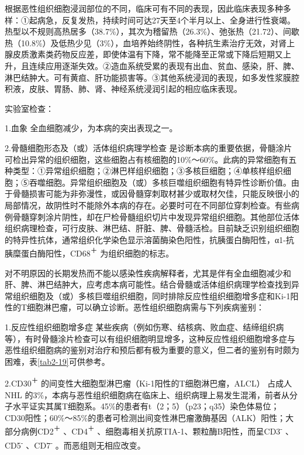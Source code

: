 根据恶性组织细胞浸润部位的不同，临床可有不同的表现，因此临床表现多种多样：①起病急，反复发热，持续时间可达27天至4个半月以上、全身进行性衰竭。热型以不规则高热居多（38.7\%），其次为稽留热（26.3\%）、弛张热（21.72）、间歇热（10.8\%）及低热少见（3\%），血培养始终阴性，各种抗生素治疗无效，对肾上腺皮质激素类药物反应差，即使体温有下降，常不能降至正常或下降后短期又上升，且连续应用逐渐失效。②造血系统受累的表现有出血、贫血、感染，肝、脾、淋巴结肿大。可有黄疸、肝功能损害等。③其他系统浸润的表现，如多发性浆膜腔积液，皮肤、胃肠、肺、肾、神经系统浸润引起的相应临床表现。

实验室检查：

1.血象 全血细胞减少，为本病的突出表现之一。

2.骨髓细胞形态及（或）活体组织病理学检查
是诊断本病的重要依据，骨髓涂片可检出异常的组织细胞，这些细胞占有核细胞的10\%～60\%。此病的异常细胞有五种类型：①异常组织细胞；②淋巴样组织细胞；③多核巨细胞；④单核样组织细胞；⑤吞噬细胞。异常组织细胞及（或）多核巨噬组织细胞有特异性诊断价值。由于骨髓损害可能为非弥漫性，或因骨髓穿刺取材甚少或取材欠佳，只能反映很小的局部情况，故阴性时不能除外本病的存在。必要时可在不同部位穿刺检查。有些病例骨髓穿刺涂片阴性，却在尸检骨髓组织切片中发现异常组织细胞。其他部位活体组织病理检查，可行皮肤、淋巴结、肝脏、脾、骨髓活检。目前缺乏识别组织细胞的特异性抗体，通常组织化学染色显示溶菌酶染色阳性，抗胰蛋白酶阳性，α1-抗胰糜蛋白酶阳性，CD68\textsuperscript{＋}
为组织细胞的标志。

对不明原因的长期发热而不能以感染性疾病解释者，尤其是伴有全血细胞减少和肝、脾、淋巴结肿大，应考虑本病可能性。结合骨髓或活体组织病理学检查找到异常组织细胞及（或）多核巨噬组织细胞，同时排除反应性组织细胞增多症和Ki-1阳性的T细胞淋巴瘤，可以确立诊断。恶性组织细胞病需与下列疾病鉴别：

1.反应性组织细胞增多症
某些疾病（例如伤寒、结核病、败血症、结缔组织病等），有时骨髓涂片检查可以有组织细胞明显增多，这种反应性组织细胞增多症与恶性组织细胞病的鉴别对治疗和预后都有极为重要的意义，但二者的鉴别有时颇为困难，表\ref{tab2-19}可供参考。

2.CD30\textsuperscript{＋}
的间变性大细胞型淋巴瘤（Ki-1阳性的T细胞淋巴瘤，ALCL） 占成人NHL
的3\%，本病与恶性组织细胞病在临床上、组织病理上易发生混淆，前者从分子水平证实其属T细胞系。45\%的患者有t（2；5）（p23；q35）染色体易位；CD30阳性；60\%～85\%的患者可检测出间变性淋巴瘤激酶基因（ALK）阳性；大部分病例CD2\textsuperscript{＋}
、CD4\textsuperscript{＋}
、细胞毒相关抗原TIA-1、颗粒酶B阳性，而呈CD3\textsuperscript{-}
、CD5\textsuperscript{-} 、CD7\textsuperscript{-} 。而恶组则无相应改变。

